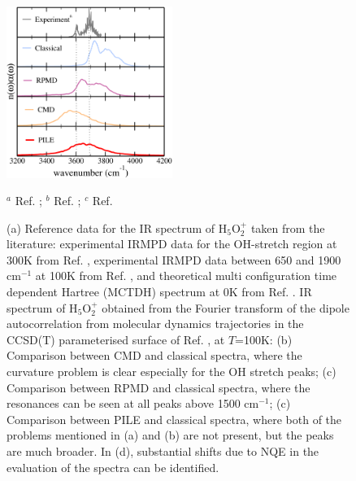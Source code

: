 \documentclass[aps,prb,superscriptaddress,amsmath,amssymb,showpacs,twocolumn]{revtex4}
\begin{document}
\begin{figure}[htbp]
\begin{center}
\includegraphics[width=0.48\textwidth]{figures/oh-stretch-300K.pdf}
\end{center}
{\small {}$^a$ Ref. \cite{YehLee1989}; {}$^b$ Ref. \cite{AsmisScience2003}; {}$^c$ Ref. \cite{VendrellMeyer2007}}
\caption{(a) Reference data for the IR spectrum of H$_5$O$_2^+$ taken from the literature: experimental
IRMPD data for the OH-stretch region at 300K from Ref. \cite{YehLee1989}, experimental IRMPD data between 650 and 1900 cm$^{-1}$ 
at 100K from Ref. \cite{AsmisScience2003}, and theoretical multi configuration time dependent Hartree (MCTDH) spectrum at 0K from Ref. \cite{VendrellMeyer2007}.
IR spectrum of H$_5$O$_2^+$ obtained from the Fourier transform of the dipole autocorrelation from molecular 
dynamics trajectories in the CCSD(T) parameterised surface of Ref. \cite{HuangBraamsBowman2005}, at $T$=100K: 
(b) Comparison between CMD and classical spectra, where the curvature problem is clear especially for the OH stretch peaks; 
(c) Comparison between RPMD and classical spectra, where the resonances can be seen at all peaks above 1500 cm$^{-1}$; (c)
Comparison between PILE and classical spectra, where both of the problems mentioned in (a) and (b) are not present, but the peaks
are much broader. In (d), substantial shifts due to NQE in the evaluation of the spectra can be identified.}
\label{fig:zundel-spectra}
\end{figure}
\end{document}
